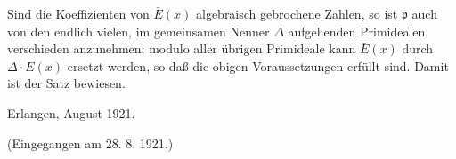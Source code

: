 Sind die Koeffizienten von $\bar E(x)$ algebraisch gebrochene Zahlen, so ist $\mathfrak p$ auch von den endlich vielen, im gemeinsamen Nenner $\Delta$ aufgehenden Primidealen verschieden anzunehmen; modulo aller übrigen Primideale kann $\bar E(x)$ durch $\Delta\cdot\bar E(x)$ ersetzt werden, so daß die obigen Voraussetzungen erfüllt sind. Damit ist der Satz bewiesen.

\begin{flushleft}
Erlangen, August 1921.
\end{flushleft}
\begin{center}
(Eingegangen am 28. 8. 1921.)
\end{center}

\clearpage
